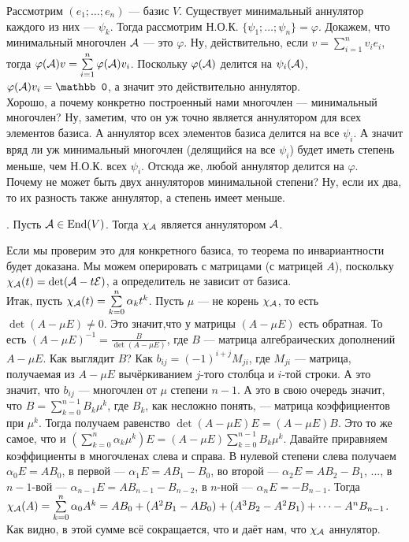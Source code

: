 \documentclass{article}
\newcommand{\id}{{\mathcal{E}}}
\begin{document}
\begin{itemize}
        \begin{Proof}
            Рассмотрим $(e_1;\ldots;e_n)$ --- базис $V$. Существует минимальный аннулятор каждого из них --- $\psi_k$. Тогда рассмотрим Н.О.К. $\{\psi_1;\ldots;\psi_n\}=\varphi$. Докажем, что минимальный многочлен ${\mathcal{A}}$ --- это $\varphi$. Ну, действительно, если $v=\sum\limits_{i=1}^nv_ie_i$, тогда $\varphi({\mathcal{A}})v=\sum\limits_{i=1}^n\varphi({\mathcal{A}})v_i$. Поскольку $\varphi({\mathcal{A}})$ делится на $\psi_i({\mathcal{A}})$, $\varphi(\scriptA)v_i=\mathbb0$, а значит это действительно аннулятор.\\
            Хорошо, а почему конкретно построенный нами многочлен --- минимальный многочлен? Ну, заметим, что он уж точно является аннулятором для всех элементов базиса. А аннулятор всех элементов базиса делится на все $\psi_i$. А значит вряд ли уж минимальный многочлен (делящийся на все $\psi_i$) будет иметь степень меньше, чем Н.О.К. всех $\psi_i$. Отсюда же, любой аннулятор делится на $\varphi$.\\
            Почему не может быть двух аннуляторов минимальной степени? Ну, если их два, то их разность также аннулятор, а степень имеет меньше.
        \end{Proof}
        \thm {}. Пусть ${\mathcal{A}}\in\operatorname{End}(V)$. Тогда $\chi_{\mathcal{A}}$ является аннулятором ${\mathcal{A}}$.
        \begin{Proof}
            Если мы проверим это для конкретного базиса, то теорема по инвариантности будет доказана. Мы можем оперировать с матрицами (с матрицей $A$), поскольку $\chi_\scriptA(t)=\det(\scriptA-t\id)$, а определитель не зависит от базиса.\\
            Итак, пусть $\chi_{\mathcal{A}}(t)=\sum\limits_{k=0}^n\alpha_k t^k$. Пусть $\mu$ --- не корень $\chi_{\mathcal{A}}$, то есть $\det(A-\mu E)\neq0$. Это значит,что у матрицы $(A-\mu E)$ есть обратная. То есть $(A-\mu E)^{-1}=\frac B{\det(A-\mu E)}$, где $B$ --- матрица алгебраических дополнений $A-\mu E$. Как выглядит $B$? Как $b_{ij}=(-1)^{i+j}M_{ji}$, где $M_{ji}$ --- матрица, получаемая из $A-\mu E$ вычёркиванием $j$-того столбца и $i$-той строки. А это значит, что $b_{ij}$ --- многочлен от $\mu$ степени $n-1$. А это в свою очередь значит, что $B=\sum\limits_{k=0}^{n-1}B_k\mu^k$, где $B_k$, как несложно понять, --- матрица коэффициентов при $\mu^k$. Тогда получаем равенство $\det(A-\mu E)E=(A-\mu E)B$. Это то же самое, что и $\left(\sum\limits_{k=0}^n\alpha_k\mu^k\right)E=(A-\mu E)\sum\limits_{k=0}^{n-1}B_k\mu^k$. Давайте приравняем коэффициенты в многочленах слева и справа. В нулевой степени слева получаем $\alpha_0E=AB_0$, в первой --- $\alpha_1E=AB_1-B_0$, во второй --- $\alpha_2E=AB_2-B_1$, ..., в $n-1$-вой --- $\alpha_{n-1}E=AB_{n-1}-B_{n-2}$, в $n$-ной --- $\alpha_nE=-B_{n-1}$. Тогда $\chi_{\mathcal{A}}(A)=\sum\limits_{k=0}^n\alpha_0A^k=AB_0+(A^2B_1-AB_0)+(A^3B_2-A^2B_1)+\cdots-A^nB_{n-1}$. Как видно, в этой сумме всё сокращается, что и даёт нам, что $\chi_{\mathcal{A}}$ аннулятор.

\end{Proof}
\end{itemize}
\end{document}
